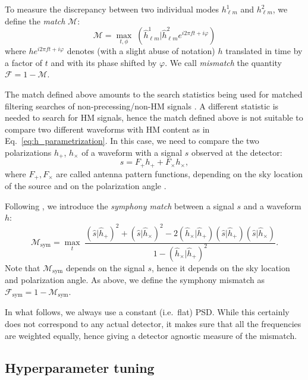 \documentclass[twocolumn,showpacs,preprintnumbers,nofootinbib,prd,
superscriptaddress,10pt]{revtex4-2}
\newcommand{\rescalar}[2]{( #1 |#2 )}
\begin{document}
To measure the discrepancy between two individual modes $h^1_{\ell m}$ and $h^2_{\ell m}$, we define the {\it match} 
$\mathcal{M}$:
\begin{equation}\label{eq:match}
	\mathcal{M} = \max_{t,\phi} \; \rescalar{\hat{h}^1_{\ell m}}{\hat{h}^2_{\ell m} e^{i 2\pi ft + i \varphi}}
\end{equation}
where $h e^{i 2\pi ft + i \varphi}$ denotes (with a slight abuse of notation) $h$ translated in time by a factor of $t$ and with its phase shifted by $\varphi$.
We call {\it mismatch} the quantity $\mathcal{F} = 1 - \mathcal{M}$.

The match defined above amounts to the search statistics being used for matched filtering searches of non-precessing/non-HM signals \cite{Harry:2016ijz}.
A different statistic is needed to search for HM signals, hence the match defined above is not suitable to compare two different waveforms with HM content 
as in Eq.~\eqref{eq:h_parametrization}.
In this case, we need to compare the two polarizations $h_+$, $h_\times$ of a waveform with a signal $s$ observed at the 
detector:
\begin{equation}
	s = F_+ h_+ + F_\times h_\times,
\end{equation}
where $F_+, F_\times$ are called antenna pattern functions, depending on the sky location of the source and on the polarization angle \cite{Maggiore:2007ulw}.

Following \cite{Harry:2017weg}, we introduce the 
{\it symphony match} 
between a signal $s$ and a waveform $h$:
\begin{equation}\label{eq:match_sym}
\mathcal{M}_\mathrm{sym} 
	= \max_t \;
		\frac{ \rescalar{\hat{s}}{\hat{h}_+}^2 + \rescalar{\hat{s}}{\hat{h}_\times}^2 - 2 \rescalar{\hat{h}_\times}{\hat{h}_+} \rescalar{\hat{s}}{\hat{h}_+} \rescalar{\hat{s}}{\hat{h}_\times}}
		{1-\rescalar{\hat{h}_\times}{\hat{h}_+}^2}.
\end{equation}
Note that $\mathcal{M}_\mathrm{sym}$ depends on the signal $s$, hence it depends on the sky location and polarization angle.
As above, we define the symphony mismatch as $\mathcal{F}_\mathrm{sym} = 1 - \mathcal{M}_\mathrm{sym}$.

In what follows, we always use a constant (i.e.~flat) PSD. While this certainly does not correspond to any actual detector, it makes sure that all the frequencies are weighted equally, hence giving a detector agnostic measure of the mismatch.

\subsection{Hyperparameter tuning}
\label{sec:hyperparameter}
\end{document}

